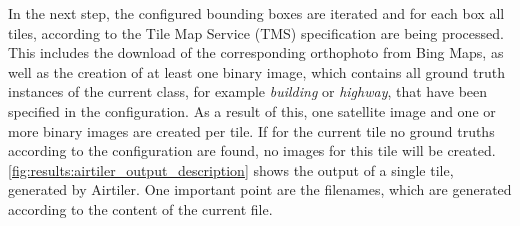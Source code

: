 In the next step, the configured bounding boxes are iterated and for each box all tiles, according to the Tile Map Service (TMS) specification \cite{tmsspec} are being processed. This includes the download of the corresponding orthophoto from Bing Maps, as well as the creation of at least one binary image, which contains all ground truth instances of the current class, for example \textit{building} or \textit{highway}, that have been specified in the configuration. As a result of this, one satellite image and one or more binary images are created per tile. If for the current tile no ground truths according to the configuration are found, no images for this tile will be created. \autoref{fig:results:airtiler_output_description} shows the output of a single tile, generated by Airtiler. One important point are the filenames, which are generated according to the content of the current file.


